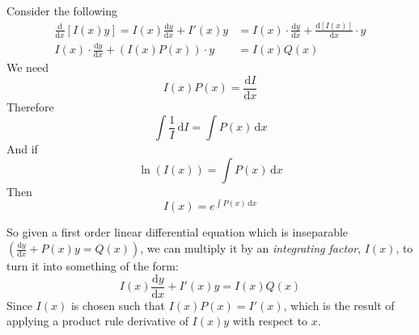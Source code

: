 \documentclass[11pt, a4paper]{article}
\begin{document}
Consider the following
\begin{align*}
\frac{\mathrm{d}}{\mathrm{d}x}\left[ I(x)y \right]=I(x)\frac{\mathrm{d}y}{\mathrm{d}x}+I'(x)y&=I(x)\cdot\frac{\mathrm{d}y}{\mathrm{d}x}+\frac{\mathrm{d}\left[ I(x) \right]}{\mathrm{d}x}\cdot y \\
I(x)\cdot\frac{\mathrm{d}y}{\mathrm{d}x}+\left(I(x)P(x)\right)\cdot y&=I(x)Q(x)
\end{align*}
We need
\begin{equation*}
I(x)P(x)=\frac{\mathrm{d}I}{\mathrm{d}x}
\end{equation*} 
Therefore
\begin{equation*}
\int \frac{1}{I}\,\mathrm{d}I=\int P(x)\,\mathrm{d}x
\end{equation*}
And if
\begin{equation*}
\ln(I(x))=\int P(x)\,\mathrm{d}x
\end{equation*}
Then
\begin{equation*}
I(x)=e^{\int P(x)\,\mathrm{d}x}
\end{equation*} \newline \par

So given a first order linear differential equation which is inseparable $\left(\frac{\mathrm{d}y}{\mathrm{d}x}+P(x)y=Q(x)\right)$, we can multiply it by an \emph{integrating factor}, $I(x)$, to turn it into something of the form:
\begin{equation*}
I(x)\frac{\mathrm{d}y}{\mathrm{d}x}+I'(x)y=I(x)Q(x)
\end{equation*}
Since $I(x)$ is chosen such that $I(x)P(x)=I'(x)$, which is the result of applying a product rule derivative of $I(x)y$ with respect to $x$.
\vspace{0.5cm}
\end{document}
